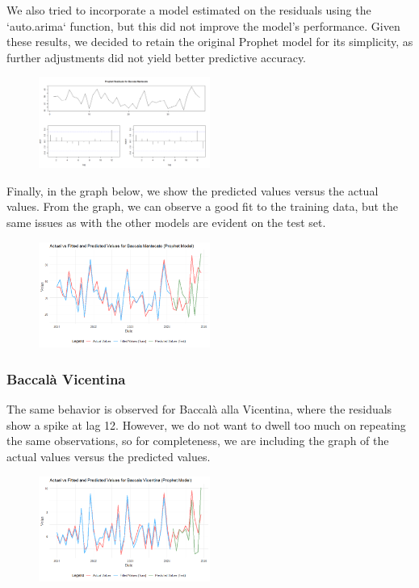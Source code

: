 \documentclass[10pt,twocolumn,letterpaper]{article}
\begin{document}
We also tried to incorporate a model estimated on the residuals using the `auto.arima` function, but this did not improve the model's performance. Given these results, we decided to retain the original Prophet model for its simplicity, as further adjustments did not yield better predictive accuracy.

\begin{figure}[H]
    \centering
    \includegraphics[width=0.5\textwidth]{PlotsBEFD/RES_PROPHET_MAN.png} 
    \caption{}
    \label{fig:esempio}
\end{figure}

Finally, in the graph below, we show the predicted values versus the actual values. From the graph, we can observe a good fit to the training data, but the same issues as with the other models are evident on the test set.
\begin{figure}[H]
    \centering
    \includegraphics[width=0.5\textwidth]{PlotsBEFD/PRED_PROPHET_MAN.png} 
    \caption{}
    \label{fig:esempio}
\end{figure}

\subsubsection{Baccalà Vicentina}
The same behavior is observed for Baccalà alla Vicentina, where the residuals show a spike at lag 12. However, we do not want to dwell too much on repeating the same observations, so for completeness, we are including the graph of the actual values versus the predicted values.
\begin{figure}[H]
    \centering
    \includegraphics[width=0.5\textwidth]{PlotsBEFD/PRED_PROPHET_VIC.png} 
    \caption{}
    \label{fig:esempio}
\end{figure}
\end{document}
